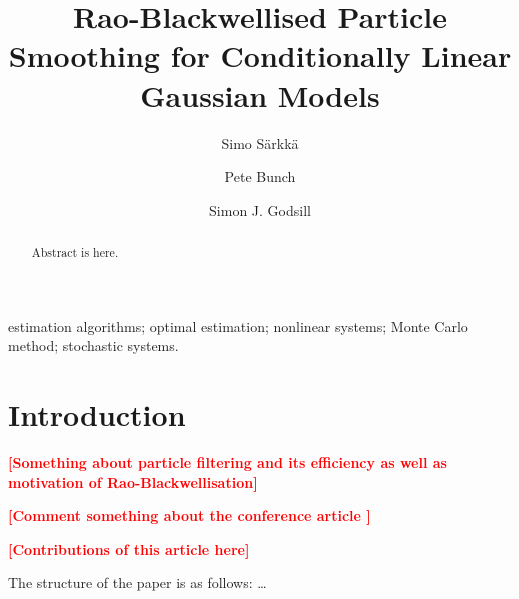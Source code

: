 \documentclass[twocolumn]{autart}    %
\newcommand{\comment}[1]{\textcolor{red}{\textbf{[#1]}}}
\begin{document}
\begin{frontmatter}

\title{Rao-Blackwellised Particle Smoothing for Conditionally Linear Gaussian Models}


\author[First]{Simo S\"arkk\"a}
\author[Second]{Pete Bunch}
\author[Third]{Simon J. Godsill}

\address[First]{Aalto University, P.O. Box
  12200. FI-00076 AALTO, Finland. (Tel: +358 50 512 4393; e-mail: simo.sarkka@aalto.fi)}
\address[Second]{University of Cambridge, Department of Engineering, Trumpington Street, Cambridge CB2 1PZ, UK (e-mail: pb404@cam.ac.uk)}
\address[Third]{University of Cambridge, Department of Engineering, Trumpington Street, Cambridge CB2 1PZ, UK (e-mail: sjg@cam.ac.uk)}

\begin{keyword}
estimation algorithms; optimal estimation; nonlinear systems;
Monte Carlo method; stochastic systems.
\end{keyword}

\begin{abstract}  %
Abstract is here.
\end{abstract}

\end{frontmatter}



\section{Introduction}
%
\comment{Something about particle filtering and its efficiency as well as motivation of Rao-Blackwellisation}

\comment{Comment something about the conference article \cite{Sarkka+Bunch+Godsill:2012}}

\comment{Contributions of this article here}

The structure of the paper is as follows: \ldots
\end{document}
